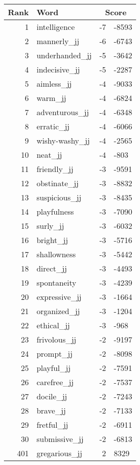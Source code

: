 \begin{longtable}[!htbp]{| rlr@{.}l |}
    \hline
    \textbf{Rank} & \textbf{Word} & \multicolumn{2}{c|}{\textbf{Score}} \\
    \hline
    \endhead
    1 & intelligence & -7 & -8593 \\
    2 & mannerly\_jj & -6 & -6743 \\
    3 & underhanded\_jj & -5 & -3642 \\
    4 & indecisive\_jj & -5 & -2287 \\
    5 & aimless\_jj & -4 & -9033 \\
    6 & warm\_jj & -4 & -6824 \\
    7 & adventurous\_jj & -4 & -6348 \\
    8 & erratic\_jj & -4 & -6066 \\
    9 & wishy-washy\_jj & -4 & -2565 \\
    10 & neat\_jj & -4 & -803 \\
    11 & friendly\_jj & -3 & -9591 \\
    12 & obstinate\_jj & -3 & -8832 \\
    13 & suspicious\_jj & -3 & -8435 \\
    14 & playfulness & -3 & -7090 \\
    15 & surly\_jj & -3 & -6032 \\
    16 & bright\_jj & -3 & -5716 \\
    17 & shallowness & -3 & -5442 \\
    18 & direct\_jj & -3 & -4493 \\
    19 & spontaneity & -3 & -4239 \\
    20 & expressive\_jj & -3 & -1664 \\
    21 & organized\_jj & -3 & -1204 \\
    22 & ethical\_jj & -3 & -968 \\
    23 & frivolous\_jj & -2 & -9197 \\
    24 & prompt\_jj & -2 & -8098 \\
    25 & playful\_jj & -2 & -7591 \\
    26 & carefree\_jj & -2 & -7537 \\
    27 & docile\_jj & -2 & -7243 \\
    28 & brave\_jj & -2 & -7133 \\
    29 & fretful\_jj & -2 & -6911 \\
    30 & submissive\_jj & -2 & -6813 \\
    401 & gregarious\_jj & 2 & 8329 \\

\end{longtable}
